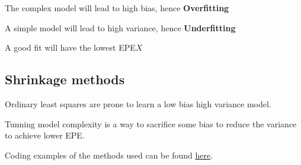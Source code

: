 \documentclass[letterpaper,12pt]{article}
\begin{document}
The complex model will lead to high bias, hence \textbf{Overfitting}

A simple model will lead to high variance, hence \textbf{Underfitting}

A good fit will have the lowest EPE\(X\)

\subsection{Shrinkage methods}
Ordinary least squares are prone to learn a low bias high variance model.

Tunning model complexity is a way to sacrifice some bias to reduce the variance
to achieve lower EPE.

Coding examples of the methods used can be found
\href{https://colab.research.google.com/drive/1ENbxMw0y86eHTorCbd1riAVOQU25-GEO?usp=sharing}{here}.
\end{document}
